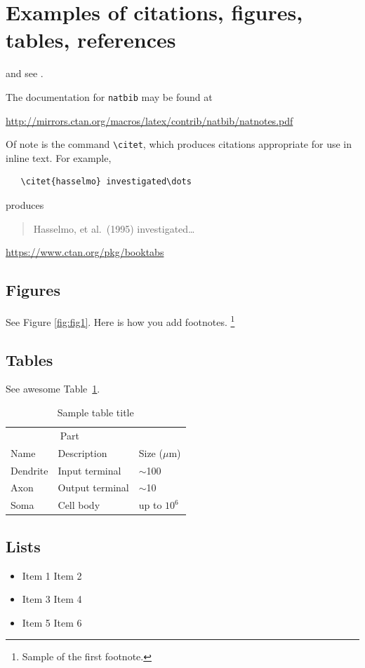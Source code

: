 \documentclass{article}
\begin{document}
\section{Examples of citations, figures, tables, references}
\label{sec:others}
\lipsum[8] \cite{kour2014real,kour2014fast} and see \cite{hadash2018estimate}.

The documentation for \verb+natbib+ may be found at
\begin{center}
  \url{http://mirrors.ctan.org/macros/latex/contrib/natbib/natnotes.pdf}
\end{center}
Of note is the command \verb+\citet+, which produces citations
appropriate for use in inline text.  For example,
\begin{verbatim}
   \citet{hasselmo} investigated\dots
\end{verbatim}
produces
\begin{quote}
  Hasselmo, et al.\ (1995) investigated\dots
\end{quote}

\begin{center}
  \url{https://www.ctan.org/pkg/booktabs}
\end{center}


\subsection{Figures}
\lipsum[10] 
See Figure \ref{fig:fig1}. Here is how you add footnotes. \footnote{Sample of the first footnote.}
\lipsum[11] 



\subsection{Tables}
\lipsum[12]
See awesome Table~\ref{tab:table}.

\begin{table}
 \caption{Sample table title}
  \centering
  \begin{tabular}{lll}
    \toprule
    \multicolumn{2}{c}{Part}                   \\
    \cmidrule(r){1-2}
    Name     & Description     & Size ($\mu$m) \\
    \midrule
    Dendrite & Input terminal  & $\sim$100     \\
    Axon     & Output terminal & $\sim$10      \\
    Soma     & Cell body       & up to $10^6$  \\
    \bottomrule
  \end{tabular}
  \label{tab:table}
\end{table}

\subsection{Lists}
\begin{itemize}
\item Item 1 Item 2
\item Item 3 Item 4
\item Item 5 Item 6
\end{itemize}


  
\end{document}
